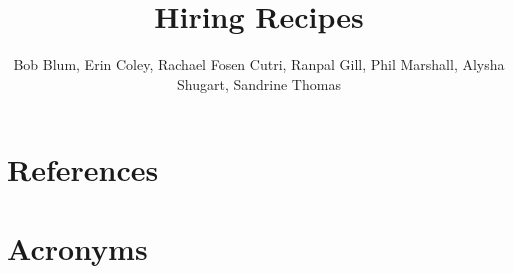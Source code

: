 \documentclass[OPS,authoryear,toc]{lsstdoc}
\title{Hiring Recipes}
\author{%
Bob Blum, Erin Coley, Rachael Fosen Cutri, Ranpal Gill, 
Phil Marshall, Alysha Shugart, Sandrine Thomas 
}
\date{\vcsDate}
\begin{document}
\maketitle


\appendix
\section{References} \label{sec:bib}
\renewcommand{\refname}{} %


\section{Acronyms} \label{sec:acronyms}

\end{document}
